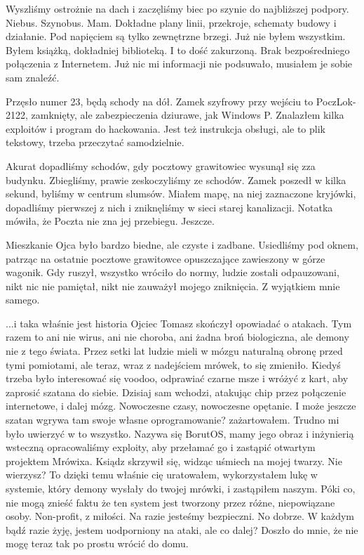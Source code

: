 Wyszliśmy ostrożnie na dach i zaczęliśmy biec po szynie do najbliższej podpory.
Niebus. Szynobus. Mam. Dokładne plany linii, przekroje, schematy budowy i działanie.
Pod napięciem są tylko zewnętrzne brzegi.
Już nie byłem wszystkim. Byłem książką, dokładniej biblioteką. I to dość zakurzoną.
Brak bezpośredniego połączenia z Internetem. Już nic mi informacji nie podsuwało, musiałem je sobie sam znaleźć.

Przęsło numer 23, będą schody na dół. Zamek szyfrowy przy wejściu to PoczLok-2122, zamknięty, ale zabezpieczenia dziurawe, jak Windows P. 
Znalazłem kilka exploitów i program do hackowania. Jest też instrukcja obsługi, ale to plik tekstowy, trzeba przeczytać samodzielnie.

Akurat dopadliśmy schodów, gdy pocztowy grawitowiec wysunął się zza budynku. 
Zbiegliśmy, prawie zeskoczyliśmy ze schodów. Zamek poszedł w kilka sekund, byliśmy w centrum slumsów.
Miałem mapę, na niej zaznaczone kryjówki, dopadliśmy pierwszej z nich i zniknęliśmy w sieci starej kanalizacji.
Notatka mówiła, że Poczta nie zna jej przebiegu. Jeszcze.

\divider{}

Mieszkanie Ojca było bardzo biedne, ale czyste i zadbane.
Usiedliśmy pod oknem, patrząc na ostatnie pocztowe grawitowce opuszczające zawieszony w górze wagonik.
Gdy ruszył, wszystko wróciło do normy, ludzie zostali odpauzowani, nikt nic nie pamiętał, nikt nie zauważył mojego zniknięcia.
Z wyjątkiem mnie samego.

\begin{dialogue}
\ds{} ...i taka właśnie jest historia \dm{} Ojciec Tomasz skończył opowiadać o atakach. \dm{}
Tym razem to ani nie wirus, ani nie choroba, ani żadna broń biologiczna, ale demony nie z tego świata.
Przez setki lat ludzie mieli w mózgu naturalną obronę przed tymi pomiotami, ale teraz, wraz z nadejściem mrówek, to się zmieniło.
Kiedyś trzeba było interesować się voodoo, odprawiać czarne msze i wróżyć z kart, aby zaprosić szatana do siebie.
Dzisiaj sam wchodzi, atakując chip przez połączenie internetowe, i dalej mózg. Nowoczesne czasy, nowoczesne opętanie.
\ds{} I może jeszcze szatan wgrywa tam swoje własne oprogramowanie? \dm{} zażartowałem. Trudno mi było uwierzyć w to wszystko.
\ds{} Nazywa się BorutOS, mamy jego obraz i inżynierią wsteczną opracowaliśmy exploity, aby przełamać go i zastąpić otwartym projektem Mrówixa. \dm{}
Ksiądz skrzywił się, widząc uśmiech na mojej twarzy. \dm{} Nie wierzysz? To dzięki temu właśnie cię uratowałem, wykorzystałem lukę w systemie, który
demony wysłały do twojej mrówki, i zastąpiłem naszym. Póki co, nie mogą znieść faktu że ten system jest tworzony przez różne, niepowiązane osoby. Non-profit, z miłości.
Na razie jesteśmy bezpieczni.
\ds{} No dobrze. W każdym bądź razie żyję, jestem uodporniony na ataki, ale co dalej? \dm{} Doszło do mnie, że nie mogę teraz tak po prostu wrócić do domu.
\end{dialogue}

